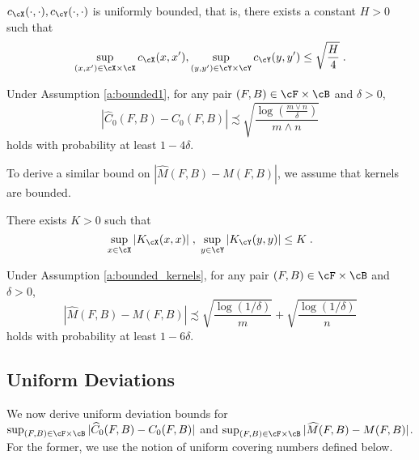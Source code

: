 \documentclass[11pt]{article}
\begin{document}
\begin{assumption}
	\label{a:bounded1}
	$c_{\cX}(\cdot, \cdot), c_{\cY}(\cdot, \cdot)$ is uniformly bounded, that is, there exists a constant $H > 0$ such that
	\begin{equation*}
		\sup_{(x, x') \in \cX \times \cX} c_{\cX}(x, x'), \sup_{(y, y') \in \cY \times \cY} c_{\cY}(y, y') \le \sqrt{\frac{H}{4}} \;.
	\end{equation*}
\end{assumption}


\begin{proposition}
	\label{prop:4}
	Under Assumption \ref{a:bounded1}, for any pair $(F, B) \in \cF \times \cB$ and $\delta > 0$, 
	\begin{equation*}
		|\widehat{C}_0(F, B) - C_0(F, B)|
		\precsim 
		\sqrt{\frac{\log(\tfrac{m \vee n}{\delta})}{m \wedge n}}
	\end{equation*}
	holds with probability at least $1 - 4 \delta$.
\end{proposition}

To derive a similar bound on $|\widehat{M}(F, B) - M(F, B)|$, we assume that kernels are bounded.

\begin{assumption}
	\label{a:bounded_kernels}
	There exists $K > 0$ such that 
	\begin{equation*}
		\sup_{x \in \cX} |K_{\cX}(x, x)| \;, \; \sup_{y \in \cY} |K_{\cY}(y, y)| \le K \;.
	\end{equation*}
\end{assumption}

\begin{proposition}
	\label{prop:mmd_fixed}
	Under Assumption \ref{a:bounded_kernels}, for any pair $(F, B) \in \cF \times \cB$ and $\delta > 0$, 
	\begin{equation*}
		|\widehat{M}(F, B) - M(F, B)|
		\precsim \sqrt{\frac{\log(1 / \delta)}{m}} + \sqrt{\frac{\log(1 / \delta)}{n}}
	\end{equation*}
	holds with probability at least $1 - 6 \delta$.
\end{proposition}


\subsection{Uniform Deviations}
We now derive uniform deviation bounds for $\sup_{(F,B) \in \cF \times \cB} |\widehat{C}_0(F, B) - C_0(F, B)|$ and $\sup_{(F,B) \in \cF \times \cB} |\widehat{M}(F, B) - M(F, B)|$. For the former, we use the notion of uniform covering numbers defined below. 
\end{document}
